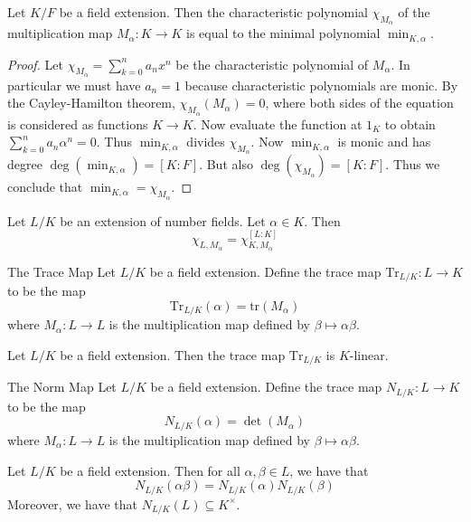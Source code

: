 \documentclass[a4paper]{article}
\begin{document}
\begin{prp}{}{} Let $K/F$ be a field extension. Then the characteristic polynomial $\chi_{M_\alpha}$ of the multiplication map $M_\alpha:K\to K$ is equal to the minimal polynomial $\min_{K,\alpha}$. 
\begin{proof}
Let $\chi_{M_\alpha}=\sum_{k=0}^na_nx^n$ be the characteristic polynomial of $M_\alpha$. In particular we must have $a_n=1$ because characteristic polynomials are monic. By the Cayley-Hamilton theorem, $\chi_{M_\alpha}(M_\alpha)=0$, where both sides of the equation is considered as functions $K\to K$. Now evaluate the function at $1_K$ to obtain $\sum_{k=0}^na_n\alpha^n=0$. Thus $\min_{K,\alpha}$ divides $\chi_{M_\alpha}$. Now $\min_{K,\alpha}$ is monic and has degree $\deg(\min_{K,\alpha})=[K:F]$. But also $\deg(\chi_{M_\alpha})=[K:F]$. Thus we conclude that $\min_{K,\alpha}=\chi_{M_\alpha}$. 
\end{proof}
\end{prp}

\begin{prp}{}{} Let $L/K$ be an extension of number fields. Let $\alpha\in K$. Then $$\chi_{L,M_\alpha}=\chi_{K,M_\alpha}^{[L:K]}$$
\end{prp}

\begin{defn}{The Trace Map}{} Let $L/K$ be a field extension. Define the trace map $\text{Tr}_{L/K}:L\to K$ to be the map $$\text{Tr}_{L/K}(\alpha)=\text{tr}(M_\alpha)$$ where $M_\alpha:L\to L$ is the multiplication map defined by $\beta\mapsto\alpha\beta$. 
\end{defn}

\begin{lmm}{}{} Let $L/K$ be a field extension. Then the trace map $\text{Tr}_{L/K}$ is $K$-linear. 
\end{lmm}

\begin{defn}{The Norm Map}{} Let $L/K$ be a field extension. Define the trace map $N_{L/K}:L\to K$ to be the map $$N_{L/K}(\alpha)=\det(M_\alpha)$$ where $M_\alpha:L\to L$ is the multiplication map defined by $\beta\mapsto\alpha\beta$. 
\end{defn}

\begin{lmm}{}{} Let $L/K$ be a field extension. Then for all $\alpha,\beta\in L$, we have that $$N_{L/K}(\alpha\beta)=N_{L/K}(\alpha)N_{L/K}(\beta)$$ Moreover, we have that $N_{L/K}(L)\subseteq K^\times$. 
\end{lmm}
\end{document}
